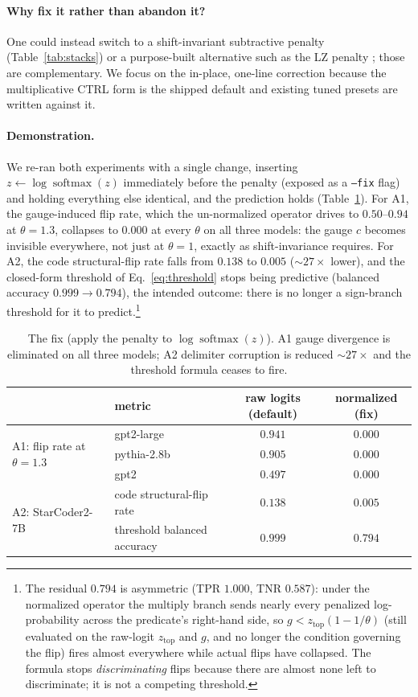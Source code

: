 \documentclass[11pt]{article}
\newcommand{\ztop}{z_{\mathrm{top}}}
\newcommand{\thp}{\theta}
\newcommand{\softmax}{\operatorname{softmax}}
\newcommand{\code}[1]{\texttt{#1}}
\begin{document}
\paragraph{Why fix it rather than abandon it?} One could instead switch to a shift-invariant
subtractive penalty (Table~\ref{tab:stacks}) or a purpose-built alternative such as the LZ
penalty \citep{ginart2025lz}; those are complementary. We focus on the in-place, one-line
correction because the multiplicative CTRL form is the shipped default and existing tuned
presets are written against it.

\paragraph{Demonstration.} We re-ran both experiments with a single change, inserting
$z \leftarrow \log\softmax(z)$ immediately before the penalty (exposed as a \code{--fix}
flag) and holding everything else identical, and the prediction holds (Table~\ref{tab:fix}). For A1,
the gauge-induced flip rate, which the un-normalized operator drives to $0.50$--$0.94$ at
$\thp=1.3$, collapses to $0.000$ at every $\thp$ on all three models: the gauge $c$
becomes invisible everywhere, not just at $\thp=1$, exactly as shift-invariance requires.
For A2, the code structural-flip rate falls from $0.138$ to $0.005$ ($\sim$$27\times$
lower), and the closed-form threshold of Eq.~\eqref{eq:threshold} stops being predictive
(balanced accuracy $0.999 \to 0.794$), the intended outcome: there is no longer a sign-branch
threshold for it to predict.\footnote{The residual $0.794$ is asymmetric (TPR $1.000$, TNR
$0.587$): under the normalized operator the multiply branch sends nearly every penalized
log-probability across the predicate's right-hand side, so $g<\ztop(1-1/\thp)$ (still evaluated
on the raw-logit $\ztop$ and $g$, and no longer the condition governing the flip) fires almost
everywhere while actual flips have collapsed. The formula stops \emph{discriminating} flips
because there are almost none left to discriminate; it is not a competing threshold.}

\begin{table}[t]
\centering
\caption{The fix (apply the penalty to $\log\softmax(z)$). A1 gauge divergence is eliminated
on all three models; A2 delimiter corruption is reduced $\sim$$27\times$ and the threshold
formula ceases to fire.}
\label{tab:fix}
\begin{tabular}{llcc}
\toprule
& metric & raw logits (default) & normalized (fix) \\
\midrule
\multirow{3}{*}{A1: flip rate at $\thp{=}1.3$}
 & gpt2-large  & $0.941$ & $0.000$ \\
 & pythia-2.8b & $0.905$ & $0.000$ \\
 & gpt2        & $0.497$ & $0.000$ \\
\midrule
\multirow{2}{*}{A2: StarCoder2-7B}
 & code structural-flip rate & $0.138$ & $0.005$ \\
 & threshold balanced accuracy & $0.999$ & $0.794$ \\
\bottomrule
\end{tabular}
\end{table}
\end{document}
